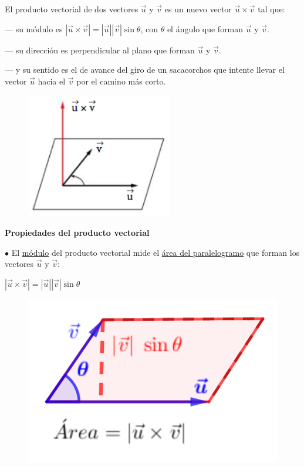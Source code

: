 \begin{defi}
El producto vectorial de dos vectores $\vec u$ y $\vec v$ es un nuevo vector $\vec u \times \vec v$	 tal que:

	\begin{multicols}{2}				
	--- su módulo es $|\vec u \times \vec v|=|\vec u||\vec v| \sin \theta $, \small{con $\theta$ el ángulo que forman $\vec u$ y $\vec v$}\normalsize{.}
				
	---  su dirección es perpendicular al plano que forman $\vec u$ y $\vec v$.
				
	---  y su sentido es el de avance del giro de un sacacorchos que intente llevar el vector $\vec u$ hacia el $\vec v$ por el camino más corto.
	
	\begin{figure}[H]
	\centering
	\includegraphics[width=.45\textwidth]{imagenes/imagenes09/T09IM20.png}
	\end{figure}
	\end{multicols}

\end{defi}


\textbf{Propiedades del producto vectorial}

\begin{multicols}{2}


\noindent $\bullet $ El \underline{módulo} del producto vectorial mide el \underline{área del paralelogramo} que forman los vectores $\vec u$ y $\vec v$:

$ |\vec u \times \vec v|=|\vec u||\vec v| \sin \theta$
\begin{figure}[H]
	\centering
	\includegraphics[width=.3\textwidth]{imagenes/imagenes09/T09IM21.png}
	\end{figure}
	\end{multicols}


